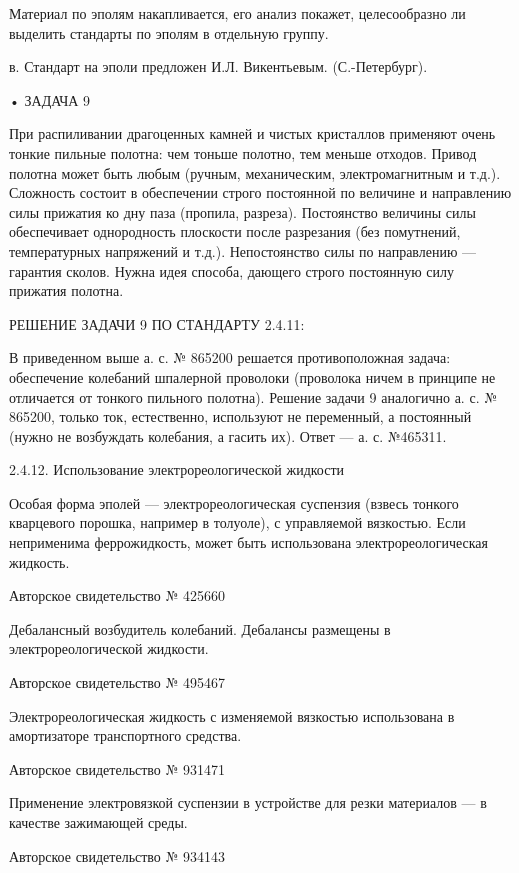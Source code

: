 Материал по эполям накапливается, его анализ покажет, целесообразно ли
выделить стандарты по эполям в отдельную группу.

в. Стандарт на эполи предложен И.Л. Викентьевым. (С.-Петербург).


• ЗАДАЧА 9

При  распиливании драгоценных  камней  и  чистых кристаллов  применяют
очень  тонкие   пильные  полотна:  чем  тоньше   полотно,  тем  меньше
отходов.  Привод  полотна  может  быть  любым  (ручным,  механическим,
электромагнитным  и  т.д.).  Сложность состоит  в  обеспечении  строго
постоянной   по  величине   и   направлению  силы   прижатия  ко   дну
паза  (пропила,  разреза).   Постоянство  величины  силы  обеспечивает
однородность плоскости после разрезания (без помутнений, температурных
напряжений  и  т.д.). Непостоянство  силы  по  направлению —  гарантия
сколов. Нужна  идея способа,  дающего строго постоянную  силу прижатия
полотна.


РЕШЕНИЕ ЗАДАЧИ 9 ПО СТАНДАРТУ 2.4.11:

В приведенном  выше а.  с. №  865200 решается  противоположная задача:
обеспечение колебаний шпалерной проволоки  (проволока ничем в принципе
не  отличается   от  тонкого  пильного  полотна).   Решение  задачи  9
аналогично  а. с.  № 865200,  только ток,  естественно, используют  не
переменный, а постоянный (нужно не возбуждать колебания, а гасить их).
Ответ — а. с. №465311.


2.4.12. Использование электрореологической жидкости

Особая   форма  эполей   —   электрореологическая  суспензия   (взвесь
тонкого  кварцевого  порошка,  например   в  толуоле),  с  управляемой
вязкостью.  Если неприменима  феррожидкость,  может быть  использована
электрореологическая жидкость.


Авторское свидетельство № 425660

Дебалансный    возбудитель    колебаний.   Дебалансы    размещены    в
электрореологической жидкости.


Авторское свидетельство № 495467

Электрореологическая  жидкость с  изменяемой вязкостью  использована в
амортизаторе транспортного средства.


Авторское свидетельство № 931471

Применение электровязкой суспензии в устройстве для резки материалов —
в качестве зажимающей среды.


Авторское свидетельство № 934143

